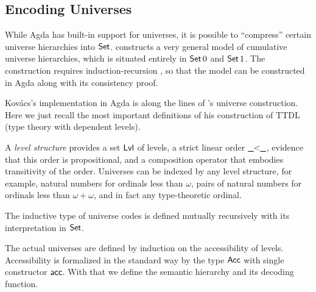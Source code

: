 \documentclass[manuscript,screen,review,anonymous]{acmart}
\begin{document}
\subsection{Encoding Universes}
\label{sec:encoding-universes}

While Agda has built-in support for universes, it is possible to
``compress'' certain universe hierarchies into
$\ASet$. \citet{DBLP:conf/csl/Kovacs22} constructs a very general model
of cumulative universe hierarchies, which is situated entirely in $\ASeti{0}$
and $\ASeti{1}$. The construction requires induction-recursion
\cite{DBLP:conf/tlca/DybjerS99}, so that the model can be constructed
in Agda along with its consistency proof.

Kov\'{a}cs's implementation in Agda is along the lines of
\citet{mcbride15:_datat_datat}'s universe construction. Here we just
recall the most important definitions of his construction of TTDL
(type theory with dependent levels).

A \emph{level structure} provides a set $\AgdaField{Lvl}$ of levels, a strict
linear order $\AgdaField{\_<\_}$, evidence that this order is propositional, and a
composition operator that embodies transitivity of the
order. Universes can be indexed by any level structure, for example,
natural numbers for ordinals less than $\omega$, pairs of natural
numbers for ordinals less than $\omega+\omega$, and in fact any
type-theoretic ordinal.

\ULvlStruct

The inductive type  of universe codes is defined mutually
recursively with its interpretation  in $\ASet$.

\begin{minipage}{0.45\linewidth}
\UUirSpec
\UUir  
\end{minipage}
\begin{minipage}{0.45\linewidth}
\UElirSpec
\UElir
\end{minipage}

The actual universes are defined by induction on the accessibility of
levels. Accessibility is formalized in the standard way by the type
$\AAcc$ with single constructor $\Aacc$.
\UUless
With that we define the semantic hierarchy and its decoding function.

\begin{minipage}{0.45\linewidth}
  \UU
\end{minipage}
\begin{minipage}{0.45\linewidth}
  \UEl
\end{minipage}
\end{document}
